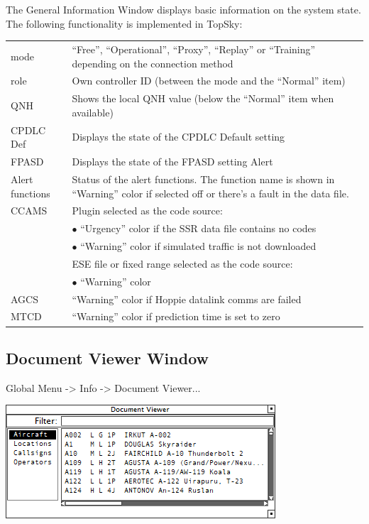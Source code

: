 \documentclass[11pt,a4paper,oldfontcommands]{memoir}
\begin{document}
The General Information Window displays basic information on the system state. The following functionality is implemented in TopSky:

\begin{tabular}{l l}
    mode                & “Free”, “Operational”, “Proxy”, “Replay” or “Training” depending on the connection method \\
    role                & Own controller ID (between the mode and the “Normal” item)\\
    QNH                 & Shows the local QNH value (below the “Normal” item when available)\\
    CPDLC Def           & Displays the state of the CPDLC Default setting\\
    FPASD               & Displays the state of the FPASD setting Alert\\
    Alert functions     & Status of the alert functions. The function name is shown in “Warning” color if selected off or there’s a fault in the data file.\\
    CCAMS               & Plugin selected as the code source:\\
                        & $\bullet$ “Urgency” color if the SSR data file contains no codes\\
                        & $\bullet$ “Warning” color if simulated traffic is not downloaded\\
                        & ESE file or fixed range selected as the code source:\\
                        & $\bullet$ “Warning” color\\
    AGCS                & “Warning” color if Hoppie datalink comms are failed\\
    MTCD                & “Warning” color if prediction time is set to zero    \\
\end{tabular}

\subsection{Document Viewer Window}
\label{win:dvw}

Global Menu -> Info -> Document Viewer...

\includegraphics{img/doc.png}
\end{document}
